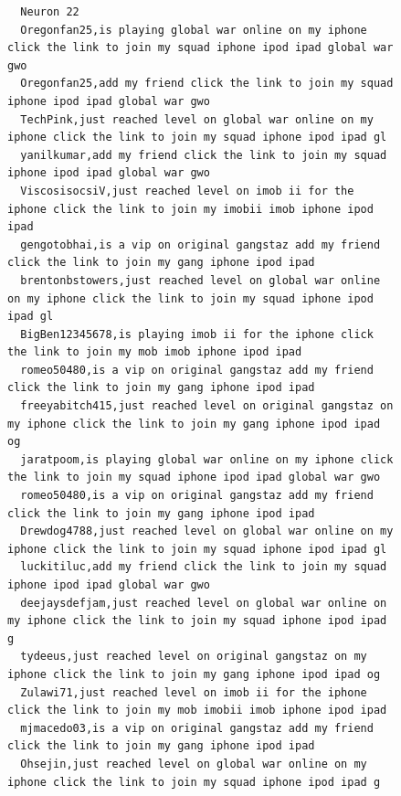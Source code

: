 \begin{figure}[htpb]
\begin{verbatim}
  Neuron 22
  Oregonfan25,is playing global war online on my iphone click the link to join my squad iphone ipod ipad global war gwo
  Oregonfan25,add my friend click the link to join my squad iphone ipod ipad global war gwo
  TechPink,just reached level on global war online on my iphone click the link to join my squad iphone ipod ipad gl
  yanilkumar,add my friend click the link to join my squad iphone ipod ipad global war gwo
  ViscosisocsiV,just reached level on imob ii for the iphone click the link to join my imobii imob iphone ipod ipad
  gengotobhai,is a vip on original gangstaz add my friend click the link to join my gang iphone ipod ipad
  brentonbstowers,just reached level on global war online on my iphone click the link to join my squad iphone ipod ipad gl
  BigBen12345678,is playing imob ii for the iphone click the link to join my mob imob iphone ipod ipad
  romeo50480,is a vip on original gangstaz add my friend click the link to join my gang iphone ipod ipad
  freeyabitch415,just reached level on original gangstaz on my iphone click the link to join my gang iphone ipod ipad og
  jaratpoom,is playing global war online on my iphone click the link to join my squad iphone ipod ipad global war gwo
  romeo50480,is a vip on original gangstaz add my friend click the link to join my gang iphone ipod ipad
  Drewdog4788,just reached level on global war online on my iphone click the link to join my squad iphone ipod ipad gl
  luckitiluc,add my friend click the link to join my squad iphone ipod ipad global war gwo
  deejaysdefjam,just reached level on global war online on my iphone click the link to join my squad iphone ipod ipad g
  tydeeus,just reached level on original gangstaz on my iphone click the link to join my gang iphone ipod ipad og
  Zulawi71,just reached level on imob ii for the iphone click the link to join my mob imobii imob iphone ipod ipad
  mjmacedo03,is a vip on original gangstaz add my friend click the link to join my gang iphone ipod ipad
  Ohsejin,just reached level on global war online on my iphone click the link to join my squad iphone ipod ipad g


\end{verbatim}
\end{figure}
